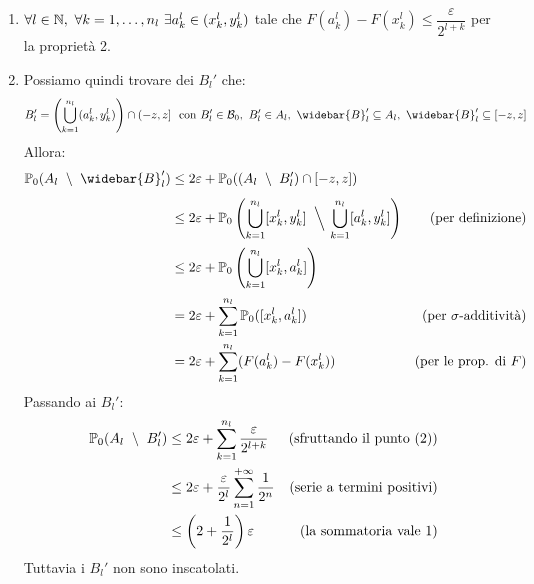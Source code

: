 \begin{dimo}
\begin{enumerate}
    \item $\forall l \in \mathbb N, \ \forall k=1, \dots , n_l \ \exists a_k^l \in (x_k^l, y_k^l)$ tale che $F(a_k^l) - F(x_k^l) \le \dfrac{\varepsilon}{2^{l+k}}$ per la proprietà 2.

    \item Possiamo quindi trovare dei $B_l'$ che:
      $$B_l' = \left( \bigcup_{k=1}^{n_l} (a_k^l, y_k^l) \right) \cap (-z,z] \ \text{ con } B_l' \in \Bc_0, \ B_l' \in A_l, \ \widebar{B}_l' \subseteq A_l , \ \widebar{B}_l' \subseteq [-z, z]$$
      Allora:
      \begin{align*}
        \PP_0(A_l \ \setminus \ \widebar{B}_l') &\le 2 \varepsilon + \PP_0 ( (A_l \ \setminus \ B_l' ) \cap [-z, z] ) \\[4pt]
        &\le 2 \varepsilon + \PP_0 \left( \bigcup_{k=1}^{n_l} [x_k^l, y_k^l] \ \mathbin{\Big\backslash} \, \bigcup_{k=1}^{n_l} [a_k^l, y_k^l] \right) & (\text{per definizione})\\[2pt]
        &\le 2 \varepsilon + \PP_0 \left( \bigcup_{k=1}^{n_l} [x_k^l, a_k^l] \right) \\[2pt]
        &= 2\varepsilon+ \sum_{k=1}^{n_l} \PP_0( [x_k^l, a_k^l]) & (\text{per $\sigma$-additività})\\
        &= 2 \varepsilon + \sum_{k=1}^{n_l} ( F(a_k^l) - F(x_k^l ) ) & (\text{per le prop. di } F)
      \end{align*}
      Passando ai $B_l'$:
      \begin{align*}
        \mathbb P_0 (A_l \ \setminus \ B_l') &\le 2 \varepsilon + \sum_{k=1}^{n_l} \dfrac{\varepsilon}{2^{l+k}} & (\text{sfruttando il punto (2)})\\
        &\le 2 \varepsilon + \dfrac{\varepsilon}{2^l} \sum_{n=1}^{+\infty} \dfrac{1}{2^n}  & (\text{serie a termini positivi})\\
        &\le \left( 2+ \dfrac{1}{2^l} \right) \varepsilon & (\text{la sommatoria vale 1})
      \end{align*}
      Tuttavia i $B_l'$ non sono inscatolati.


\end{enumerate}
\end{dimo}
